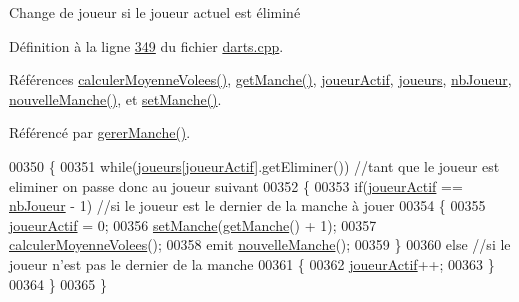 Change de joueur si le joueur actuel est éliminé 



Définition à la ligne \hyperlink{darts_8cpp_source_l00349}{349} du fichier \hyperlink{darts_8cpp_source}{darts.\+cpp}.



Références \hyperlink{darts_8cpp_source_l00387}{calculer\+Moyenne\+Volees()}, \hyperlink{darts_8cpp_source_l00044}{get\+Manche()}, \hyperlink{darts_8h_source_l00076}{joueur\+Actif}, \hyperlink{darts_8h_source_l00073}{joueurs}, \hyperlink{darts_8h_source_l00075}{nb\+Joueur}, \hyperlink{class_darts_ace3f99f5381399b0b86e5b8192d6fd71}{nouvelle\+Manche()}, et \hyperlink{darts_8cpp_source_l00132}{set\+Manche()}.



Référencé par \hyperlink{darts_8cpp_source_l00303}{gerer\+Manche()}.


\begin{DoxyCode}
00350 \{
00351     \textcolor{keywordflow}{while}(\hyperlink{class_darts_a81bc116f3ae70cea1f492f87f01901c7}{joueurs}[\hyperlink{class_darts_a68fb01b9aad6502e4429dfbf2a72d50b}{joueurActif}].getEliminer()) \textcolor{comment}{//tant que le joueur est eliminer on passe
       donc au joueur suivant}
00352     \{
00353         \textcolor{keywordflow}{if}(\hyperlink{class_darts_a68fb01b9aad6502e4429dfbf2a72d50b}{joueurActif} == \hyperlink{class_darts_ac5ae0e3546d00f59adba76c4ece71725}{nbJoueur} - 1)  \textcolor{comment}{//si le joueur est le dernier de la manche à
       jouer}
00354         \{
00355             \hyperlink{class_darts_a68fb01b9aad6502e4429dfbf2a72d50b}{joueurActif} = 0;
00356             \hyperlink{class_darts_ab038eac80e5fc5e8abbab5682e87f8f2}{setManche}(\hyperlink{class_darts_a2ce03c887d90f3a997648981d342b50c}{getManche}() + 1);
00357             \hyperlink{class_darts_af87b6a1cd30838b99379aa4061fc43cc}{calculerMoyenneVolees}();
00358             emit \hyperlink{class_darts_ace3f99f5381399b0b86e5b8192d6fd71}{nouvelleManche}();
00359         \}
00360         \textcolor{keywordflow}{else}                            \textcolor{comment}{//si le joueur n'est pas le dernier de la manche}
00361         \{
00362             \hyperlink{class_darts_a68fb01b9aad6502e4429dfbf2a72d50b}{joueurActif}++;
00363         \}
00364     \}
00365 \}
\end{DoxyCode}
\mbox{\label{class_darts_ac96311be89ac838f4a37b91bd5655171}} 
